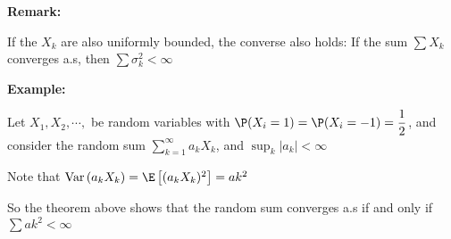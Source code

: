 \par\bigskip
\noindent\textbf{Remark:}\par
\noindent If the $X_k$ are also uniformly bounded, the converse also holds: If the sum $\sum X_k$ converges a.s, then $\sum \sigma_k^2<\infty$
\par\bigskip
\noindent\textbf{Example:}\par
\noindent Let $X_1,X_2, \cdots, $ be random variables with $\P(X_i=1) = \P(X_i=-1) = \dfrac{1}{2}$, and consider the random sum $\sum_{k=1}^{\infty}a_kX_k$, and $\sup_k\left|a_k\right|<\infty$\par
\noindent Note that $\text{Var}\left(a_kX_k\right) = \E\left[(a_kX_k)^2\right] = ak^2$\par
\noindent So the theorem above shows that the random sum converges a.s if and only if $\sum ak^2<\infty$
\par\bigskip
